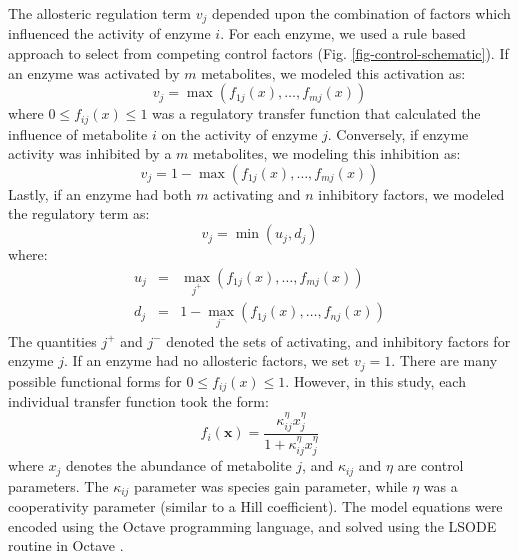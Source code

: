 \documentclass[12pt]{article}
\begin{document}
The allosteric regulation term $v_{j}$ depended upon the combination of factors which influenced the activity of enzyme $i$.
For each enzyme, we used a rule based approach to select from competing control factors (Fig. \ref{fig-control-schematic}). 
If an enzyme was activated by $m$ metabolites, we modeled this activation as:
\begin{equation}
	v_{j} = \max\left(f_{1j}\left(x\right),\hdots,f_{mj}\left(x\right)\right)
\end{equation}where $0\leq f_{ij}\left(x\right)\leq 1$ was a regulatory transfer function that calculated the influence of metabolite $i$ on the activity of enzyme $j$. 
Conversely, if enzyme activity was inhibited by a $m$ metabolites, we modeling this inhibition as:
\begin{equation}
	v_{j} = 1 - \max\left(f_{1j}\left(x\right),\hdots,f_{mj}\left(x\right)\right)
\end{equation}Lastly, if an enzyme had both $m$ activating and $n$ inhibitory factors, we modeled the regulatory term as:
\begin{equation}
	v_{j} = \min\left(u_{j},d_{j}\right)
\end{equation}where:
\begin{eqnarray}
	u_{j} &=& \max_{j^{+}}\left(f_{1j}\left(x\right),\hdots,f_{mj}\left(x\right)\right) \\
	d_{j} &=& 1 - \max_{j^{-}}\left(f_{1j}\left(x\right),\hdots,f_{nj}\left(x\right)\right)
\end{eqnarray}The quantities $j^{+}$ and $j^{-}$ denoted the sets of activating, and inhibitory factors for enzyme $j$. 
If an enzyme had no allosteric factors, we set $v_{j} = 1$.
There are many possible functional forms for $0\leq f_{ij}\left(x\right)\leq 1$. 
However, in this study, each individual transfer function took the form:
\begin{equation}\label{eqn:control-factor}
	f_{i}\left(\mathbf{x}\right) = \frac{\kappa_{ij}^{\eta}x_{j}^{\eta}}{1 + \kappa_{ij}^{\eta}x_{j}^{\eta}}
\end{equation}where $x_{j}$ denotes the abundance of metabolite $j$, and $\kappa_{ij}$ and $\eta$ are control parameters. 
The $\kappa_{ij}$ parameter was species gain parameter, while $\eta$ was a cooperativity parameter (similar to a Hill coefficient).
The model equations were encoded using the Octave programming language, and solved using the LSODE routine in Octave \citep{Octave:2014}.
\end{document}
